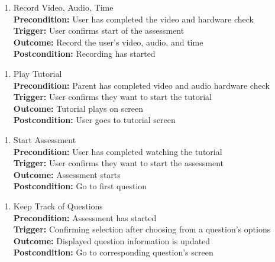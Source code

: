 \documentclass[12pt]{article}
\begin{document}
\begin{enumerate}[label={PUC-}13. ]
  \item Record Video, Audio, Time\\
  \textbf{Precondition: }User has completed the video and hardware check\\
  \textbf{Trigger: }User confirms start of the assessment\\
  \textbf{Outcome: }Record the user's video, audio, and time\\
  \textbf{Postcondition: }Recording has started\\
\end{enumerate}

\begin{enumerate}[label={PUC-}14. ]
  \item Play Tutorial\\
  \textbf{Precondition: }Parent has completed video and audio hardware check\\
  \textbf{Trigger: }User confirms they want to start the tutorial\\
  \textbf{Outcome: }Tutorial plays on screen\\
  \textbf{Postcondition: }User goes to tutorial screen\\
\end{enumerate}

\begin{enumerate}[label={PUC-}15. ]
  \item Start Assessment\\
  \textbf{Precondition: }User has completed watching the tutorial\\
  \textbf{Trigger: }User confirms they want to start the assessment\\
  \textbf{Outcome: }Assessment starts\\
  \textbf{Postcondition: }Go to first question\\
\end{enumerate}

\begin{enumerate}[label={PUC-}16. ]
  \item Keep Track of Questions\\
  \textbf{Precondition: }Assessment has started\\
  \textbf{Trigger: }Confirming selection after choosing from a question's options\\
  \textbf{Outcome: }Displayed question information is updated\\
  \textbf{Postcondition: }Go to corresponding question's screen\\
\end{enumerate}
\end{document}
